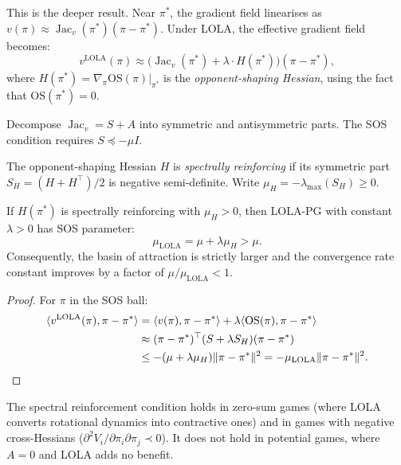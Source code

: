 This is the deeper result. Near $\pi^*$, the gradient field linearises as $v(\pi) \approx \operatorname{Jac}_v(\pi^*)(\pi - \pi^*)$. Under LOLA, the effective gradient field becomes:
\[
    v^{\mathrm{LOLA}}(\pi) \approx \bigl(\operatorname{Jac}_v(\pi^*) + \lambda \cdot H(\pi^*)\bigr)(\pi - \pi^*),
\]
where $H(\pi^*) = \nabla_\pi \mathrm{OS}(\pi)\big|_{\pi^*}$ is the \emph{opponent-shaping Hessian}, using the fact that $\mathrm{OS}(\pi^*) = 0$.

Decompose $\operatorname{Jac}_v = S + A$ into symmetric and antisymmetric parts. The SOS condition requires $S \preceq -\mu I$.

\begin{definition}
\label{def:spectral-ch7}
The opponent-shaping Hessian $H$ is \emph{spectrally reinforcing} if its symmetric part $S_H = (H + H^\top)/2$ is negative semi-definite. Write $\mu_H = -\lambda_{\max}(S_H) \geq 0$.
\end{definition}

\begin{theorem}
\label{thm:basin-ch7}
If $H(\pi^*)$ is spectrally reinforcing with $\mu_H > 0$, then LOLA-PG with constant $\lambda > 0$ has SOS parameter:
\begin{equation}
\label{eq:mu-lola-ch7}
\boxed{
    \mu_{\mathrm{LOLA}} = \mu + \lambda \mu_H > \mu.
}
\end{equation}
Consequently, the basin of attraction is strictly larger and the convergence rate constant improves by a factor of $\mu/\mu_{\mathrm{LOLA}} < 1$.
\end{theorem}

\begin{proof}
For $\pi$ in the SOS ball:
\begin{align*}
    \langle v^{\mathrm{LOLA}}(\pi), \pi - \pi^* \rangle
    &= \langle v(\pi), \pi - \pi^* \rangle + \lambda \langle \mathrm{OS}(\pi), \pi - \pi^* \rangle \\
    &\approx (\pi - \pi^*)^\top (S + \lambda S_H)(\pi - \pi^*) \\
    &\leq -(\mu + \lambda\mu_H)\|\pi - \pi^*\|^2 = -\mu_{\mathrm{LOLA}}\|\pi - \pi^*\|^2. \qedhere
\end{align*}
\end{proof}

The spectral reinforcement condition holds in zero-sum games (where LOLA converts rotational dynamics into contractive ones) and in games with negative cross-Hessians ($\partial^2 V_i / \partial\pi_i \partial\pi_j \prec 0$). It does not hold in potential games, where $A = 0$ and LOLA adds no benefit.


